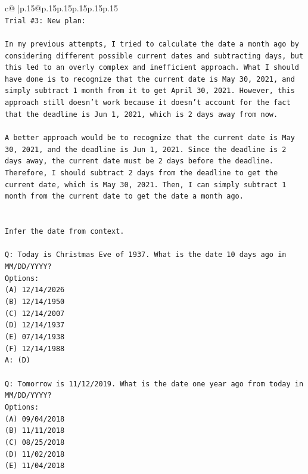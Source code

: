 \documentclass{article}
\begin{document}
{\begin{supertabular}{c@{$\;$}|p{.15\linewidth}@{}p{.15\linewidth}p{.15\linewidth}p{.15\linewidth}p{.15\linewidth}p{.15\linewidth}}
{{{\\ 
\texttt{Trial \#3: New plan: } \\
\\ 
\texttt{In my previous attempts, I tried to calculate the date a month ago by considering different possible current dates and subtracting days, but this led to an overly complex and inefficient approach. What I should have done is to recognize that the current date is May 30, 2021, and simply subtract 1 month from it to get April 30, 2021. However, this approach still doesn't work because it doesn't account for the fact that the deadline is Jun 1, 2021, which is 2 days away from now. } \\
\\ 
\texttt{A better approach would be to recognize that the current date is May 30, 2021, and the deadline is Jun 1, 2021. Since the deadline is 2 days away, the current date must be 2 days before the deadline. Therefore, I should subtract 2 days from the deadline to get the current date, which is May 30, 2021. Then, I can simply subtract 1 month from the current date to get the date a month ago.} \\
\\ 
\\ 
\texttt{Infer the date from context.} \\
\\ 
\texttt{Q: Today is Christmas Eve of 1937. What is the date 10 days ago in MM/DD/YYYY?} \\
\texttt{Options:} \\
\texttt{(A) 12/14/2026} \\
\texttt{(B) 12/14/1950} \\
\texttt{(C) 12/14/2007} \\
\texttt{(D) 12/14/1937} \\
\texttt{(E) 07/14/1938} \\
\texttt{(F) 12/14/1988} \\
\texttt{A: (D)} \\
\\ 
\texttt{Q: Tomorrow is 11/12/2019. What is the date one year ago from today in MM/DD/YYYY?} \\
\texttt{Options:} \\
\texttt{(A) 09/04/2018} \\
\texttt{(B) 11/11/2018} \\
\texttt{(C) 08/25/2018} \\
\texttt{(D) 11/02/2018} \\
\texttt{(E) 11/04/2018} \\
}}}
\end{supertabular}}
\end{document}
